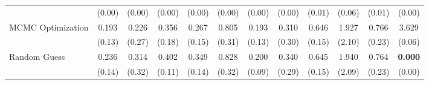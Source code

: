 \begin{table}[ht]
{\begin{tabular}{l cccc cccc cc c}
             & (0.00) & (0.00) & (0.00) & (0.00) & (0.00) & (0.00) & (0.00) & (0.01) & (0.06) & (0.01) & (0.00) \\
            \addlinespace[0.2em]
            MCMC Optimization & 0.193 & 0.226 & 0.356 & 0.267 & 0.805 & 0.193 & 0.310 & 0.646 & 1.927 & 0.766 & 3.629 \\
             & (0.13) & (0.27) & (0.18) & (0.15) & (0.31) & (0.13) & (0.30) & (0.15) & (2.10) & (0.23) & (0.06) \\
            \addlinespace[0.2em]
            Random Guess & 0.236 & 0.314 & 0.402 & 0.349 & 0.828 & 0.200 & 0.340 & 0.645 & 1.940 & 0.764 & \textbf{0.000} \\
             & (0.14) & (0.32) & (0.11) & (0.14) & (0.32) & (0.09) & (0.29) & (0.15) & (2.09) & (0.23) & (0.00) \\
            \bottomrule
        \end{tabular}%
    }
\end{table}